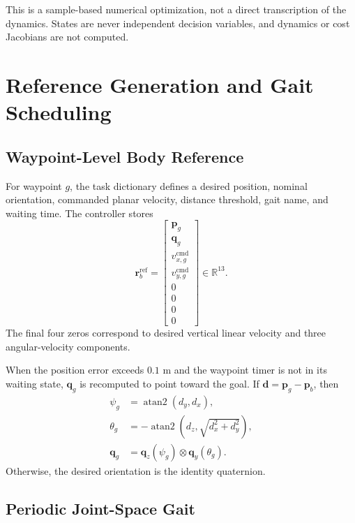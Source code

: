 \documentclass[11pt,a4paper]{article}
\newcommand{\R}{\mathbb{R}}
\begin{document}
This is a sample-based numerical optimization, not a direct transcription of
the dynamics.  States are never independent decision variables, and dynamics
or cost Jacobians are not computed.

\section{Reference Generation and Gait Scheduling}

\subsection{Waypoint-Level Body Reference}

For waypoint $g$, the task dictionary defines a desired position, nominal
orientation, commanded planar velocity, distance threshold, gait name, and
waiting time.  The controller stores
\begin{equation}
  \bm{r}_b^{\mathrm{ref}}=
  \begin{bmatrix}
    \bm{p}_g\\
    \bm{q}_g\\
    v_{x,g}^{\mathrm{cmd}}\\
    v_{y,g}^{\mathrm{cmd}}\\
    0\\0\\0\\0
  \end{bmatrix}\in\R^{13}.
\end{equation}
The final four zeros correspond to desired vertical linear velocity and three
angular-velocity components.

When the position error exceeds $0.1$ m and the waypoint timer is not in its
waiting state, $\bm{q}_g$ is recomputed to point toward the goal.  If
$\bm{d}=\bm{p}_g-\bm{p}_b$, then
\begin{align}
  \psi_g &= \operatorname{atan2}(d_y,d_x),\\
  \theta_g &= -\operatorname{atan2}
  \left(d_z,\sqrt{d_x^2+d_y^2}\right),\\
  \bm{q}_g &= \bm{q}_z(\psi_g)\otimes\bm{q}_y(\theta_g).
\end{align}
Otherwise, the desired orientation is the identity quaternion.

\subsection{Periodic Joint-Space Gait}
\end{document}
